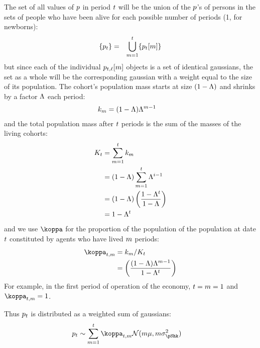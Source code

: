 \documentclass[../BufferStockTheory.tex]{subfiles}\usepackage{ApndxSteadyState}
\begin{document}
  \newpage
  The set of all values of $\pLog$ in period $\FutPer$ will be the union of the $\pLog$'s of persons in the sets of people who have been alive for each possible number of periods (1, for newborns):
  \begin{eqnarray}
    \{\pLog_{\FutPer}\} & = & \bigcup_{\LooPer=1}^{\FutPer}\{\pLog_{\FutPer}[\LooPer]\}
  \end{eqnarray}
  but since each of the individual $\pLog_{\FutPer,\posn}[\LooPer]$ objects is a set of identical gaussians, the set as a whole will be the corresponding gaussian with a weight equal to the size of its population.  The cohort's population mass starts at size $(1-\Liv)$ and shrinks by a factor $\Liv$ each period:
  \begin{align}
    \mass_{\LooPer} & =  (1-\Liv)\Liv^{\LooPer-1} \label{eq:mass}
  \end{align}
  and the total population mass after $\FutPer$ periods is the sum of the masses of the living cohorts:
  \begin{align}
    \Mass_{\FutPer} & =  \sum_{\LooPer=1}^{\FutPer}\mass_{\LooPer}
    \\ & =  (1-\Liv)\sum_{\LooPer=1}^{\FutPer}\Liv^{\NewPer-1}
    \\ & =  (1-\Liv)\left(\frac{1-\Liv^{t}}{1-\Liv}\right)
    \\ & = 1-\Liv^{t}
  \end{align}
  and we use $\wgt$ for the proportion of the population of the population at date $\FutPer$ constituted by agents who have lived $\LooPer$ periods:
  \begin{align}
    \wgt_{\FutPer,\LooPer} & =  \mass_{\LooPer}/\Mass_{\FutPer}
    \\ & = \left(\frac{(1-\Liv)\Liv^{\LooPer-1}}{1-\Liv^{\FutPer}}\right) \label{eq:wgt}
  \end{align}
  For example, in the first period of operation of the economy, $\FutPer=\LooPer=1$ and $\wgt_{\FutPer,\LooPer}=1$.

  Thus $\pLog_{\FutPer}$ is distributed as a weighted sum of gaussians:
  \begin{align}
    \pLog_{\FutPer} & \sim \sum_{\LooPer=1}^{\FutPer}\wgt_{\FutPer,\LooPer}\mathcal{N}(\LooPer \pShkMean,\LooPer \sigma^{2}_{\pShk})
  \end{align}
\end{document}
